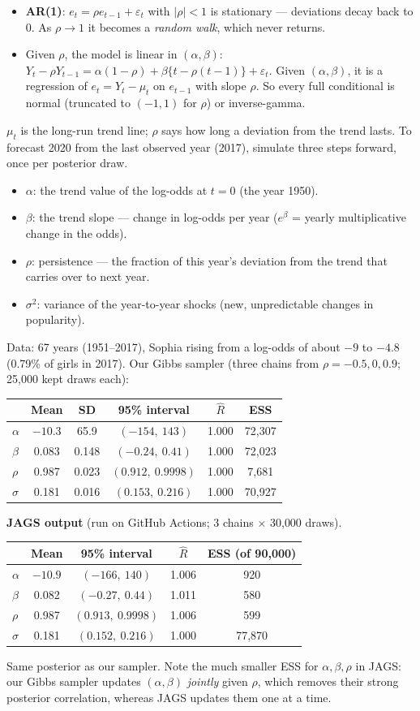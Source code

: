 \documentclass[11pt]{article}
\newcommand{\JAGSnineTable}{%
\centering
\begin{tabular}{lcccc}\toprule
 & Mean & 95\% interval & $\hat R$ & ESS (of 90{,}000)\\\midrule
$\alpha$ & $-10.9$ & $(-166,\ 140)$ & 1.006 & 920\\
$\beta$ & 0.082 & $(-0.27,\ 0.44)$ & 1.011 & 580\\
$\rho$ & 0.987 & $(0.913,\ 0.9998)$ & 1.006 & 599\\
$\sigma$ & 0.181 & $(0.152,\ 0.216)$ & 1.000 & 77{,}870\\\bottomrule
\end{tabular}\par\smallskip\raggedright
Same posterior as our sampler. Note the much smaller ESS for $\alpha,\beta,\rho$ in JAGS: our Gibbs sampler updates $(\alpha,\beta)$ \emph{jointly} given $\rho$, which removes their strong posterior correlation, whereas JAGS updates them one at a time.}
\newcommand{\JAGSexnine}{%
\begin{sanity}\small\textbf{JAGS output} (run on GitHub Actions; 3 chains $\times$ 30{,}000 draws).\par\smallskip
\JAGSnineTable
\end{sanity}}
\begin{document}
\begin{recall}
\begin{itemize}
\item \textbf{AR(1)}: $e_t=\rho e_{t-1}+\varepsilon_t$ with $|\rho|<1$ is stationary --- deviations decay back to 0. As $\rho\to1$ it becomes a \emph{random walk}, which never returns.
\item Given $\rho$, the model is linear in $(\alpha,\beta)$: $Y_t-\rho Y_{t-1}=\alpha(1-\rho)+\beta\{t-\rho(t-1)\}+\varepsilon_t$. Given $(\alpha,\beta)$, it is a regression of $e_t=Y_t-\mu_t$ on $e_{t-1}$ with slope $\rho$. So every full conditional is normal (truncated to $(-1,1)$ for $\rho$) or inverse-gamma.
\end{itemize}
\end{recall}

\begin{keyidea}
$\mu_t$ is the long-run trend line; $\rho$ says how long a deviation from the trend lasts. To forecast 2020 from the last observed year (2017), simulate three steps forward, once per posterior draw.
\end{keyidea}

\solution
{}
\begin{itemize}
\item $\alpha$: the trend value of the log-odds at $t=0$ (the year 1950).
\item $\beta$: the trend slope --- change in log-odds per year ($e^\beta$ = yearly multiplicative change in the odds).
\item $\rho$: persistence --- the fraction of this year's deviation from the trend that carries over to next year.
\item $\sigma^2$: variance of the year-to-year shocks (new, unpredictable changes in popularity).
\end{itemize}

 Data: 67 years (1951--2017), Sophia rising from a log-odds of about $-9$ to $-4.8$ (0.79\% of girls in 2017). Our Gibbs sampler (three chains from $\rho=-0.5,0,0.9$; 25{,}000 kept draws each):
\begin{center}
\begin{tabular}{lccccc}\toprule
 & Mean & SD & 95\% interval & $\hat R$ & ESS\\\midrule
$\alpha$ & $-10.3$ & 65.9 & $(-154,\ 143)$ & 1.000 & 72{,}307\\
$\beta$ & 0.083 & 0.148 & $(-0.24,\ 0.41)$ & 1.000 & 72{,}023\\
$\rho$ & 0.987 & 0.023 & $(0.912,\ 0.9998)$ & 1.000 & 7{,}681\\
$\sigma$ & 0.181 & 0.016 & $(0.153,\ 0.216)$ & 1.000 & 70{,}927\\\bottomrule
\end{tabular}
\end{center}
\JAGSexnine
{}
\end{document}
